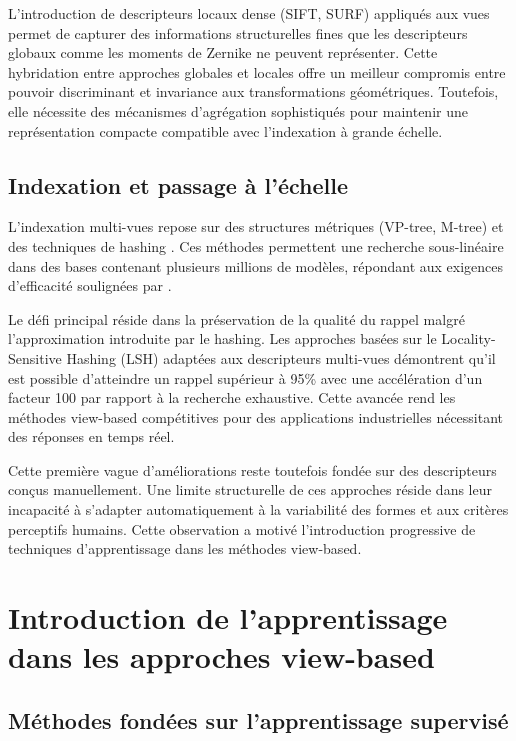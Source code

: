 \documentclass[11pt,a4paper,oneside]{report}
\begin{document}
L'introduction de descripteurs locaux dense (SIFT, SURF) appliqués aux vues permet de capturer des informations structurelles fines que les descripteurs globaux comme les moments de Zernike ne peuvent représenter. Cette hybridation entre approches globales et locales offre un meilleur compromis entre pouvoir discriminant et invariance aux transformations géométriques. Toutefois, elle nécessite des mécanismes d'agrégation sophistiqués pour maintenir une représentation compacte compatible avec l'indexation à grande échelle.

\subsection{Indexation et passage à l'échelle}

L'indexation multi-vues repose sur des structures métriques (VP-tree, M-tree) et des techniques de hashing \cite{li2012large}. Ces méthodes permettent une recherche sous-linéaire dans des bases contenant plusieurs millions de modèles, répondant aux exigences d'efficacité soulignées par \cite{tangelder2007survey}.

Le défi principal réside dans la préservation de la qualité du rappel malgré l'approximation introduite par le hashing. Les approches basées sur le Locality-Sensitive Hashing (LSH) adaptées aux descripteurs multi-vues démontrent qu'il est possible d'atteindre un rappel supérieur à 95\% avec une accélération d'un facteur 100 par rapport à la recherche exhaustive. Cette avancée rend les méthodes view-based compétitives pour des applications industrielles nécessitant des réponses en temps réel.

Cette première vague d'améliorations reste toutefois fondée sur des descripteurs conçus manuellement. Une limite structurelle de ces approches réside dans leur incapacité à s'adapter automatiquement à la variabilité des formes et aux critères perceptifs humains. Cette observation a motivé l'introduction progressive de techniques d'apprentissage dans les méthodes view-based.

\section{Introduction de l'apprentissage dans les approches view-based}

\subsection{Méthodes fondées sur l'apprentissage supervisé}
\end{document}
